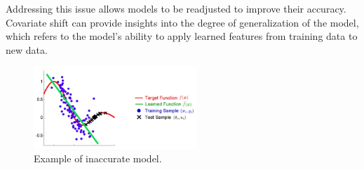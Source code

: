 Addressing this issue allows models to be readjusted to improve their accuracy. Covariate shift can provide insights into the degree of generalization of the model, which refers to the model's ability to apply learned features from training data to new data.

\begin{figure}[H]
	\centering
	\includegraphics[width=0.55\textwidth]{assets/covariate_shift.png} 
	\caption{Example of inaccurate model.}
	\label{fig:inaccurate-model}
\end{figure}
